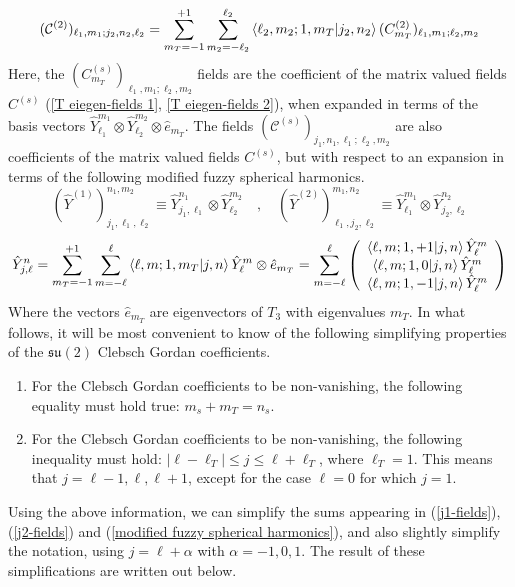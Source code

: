 %
%
\begin{equation}\label{j2-fields}
(\mathcal{C}^{(2)})_{\ell_1, m_1; j_2,n_2,\ell_2}
=
\sum_{m_T = -1}^{+1}
\sum_{m_2 = -\ell_2}^{\ell_2}
\braket{\ell_2,m_2;1,m_T}{j_2, n_2}
(C^{(2)}_{m_T})_{\ell_1,m_1;\ell_2,m_2} 
\end{equation}
%
%
Here, the $(C^{(s)}_{m_T})_{\ell_1,m_1;\ell_2,m_2}$ fields are the coefficient of the matrix valued fields $C^{(s)}$ (\ref{T eiegen-fields 1}, \ref{T eiegen-fields 2}), when expanded in terms of the basis vectors $\hat{Y}^{m_1}_{\ell_1} \otimes \hat{Y}^{m_2}_{\ell_2} \otimes \hat{e}_{m_T}$. The fields $(\mathcal{C}^{(s)})_{j_1,n_1,\ell_1; \ell_2, m_2}$ are also coefficients of the matrix valued fields $C^{(s)}$, but with respect to an expansion in terms of the following modified fuzzy spherical harmonics. 
%
%
\begin{equation}
(\hat{Y}^{(1)})^{n_1,m_2}_{j_1, \ell_1, \ell_2}
\equiv
\hat{Y}^{n_1}_{j_1,\ell_1} \otimes \hat{Y}^{m_2}_{\ell_2}
%
\quad , \quad
%
(\hat{Y}^{(2)})^{m_1,n_2}_{\ell_1,j_2, \ell_2}
\equiv
\hat{Y}^{m_1}_{\ell_1} \otimes \hat{Y}^{n_2}_{j_2,\ell_2}
\end{equation}
%
%
\begin{equation}\label{modified fuzzy spherical harmonics}
\hat{Y}^n_{j,\ell} = \sum_{m_T = -1}^{+1} \sum_{m = -\ell}^{\ell}
\braket{\ell, m;1,m_T}{j,n}
\hat{Y}_\ell^{m} \otimes \hat{e}_{m_T}
=
\sum_{m = -\ell}^{\ell}
\left( \begin{array}{c}
\braket{\ell, m;1,+1}{j,n} \hat{Y}_\ell^{m} \\
\braket{\ell, m;1,0}{j,n} \hat{Y}_\ell^{m} \\
\braket{\ell, m;1,-1}{j,n} \hat{Y}_\ell^{m} \\
\end{array} \right)
\end{equation}
%
%
Where the vectors $\hat{e}_{m_T}$ are eigenvectors of $T_3$ with eigenvalues $m_T$. In what follows, it will be most convenient to know of the following simplifying properties of the $\mathfrak{su}(2)$ Clebsch Gordan coefficients.
%
%
\begin{enumerate}
%
\item For the Clebsch Gordan coefficients to be non-vanishing, the following equality must hold true: $m_s + m_T = n_s$.
%
\item For the Clebsch Gordan coefficients to be non-vanishing, the following inequality must hold: $|\ell - \ell_T| \leq j \leq \ell + \ell_T$, where $\ell_T = 1$. This means that $j = \ell-1,\ell,\ell+1$, except for the case $\ell=0$ for which $j = 1$.
%
\end{enumerate}
%
%
Using the above information, we can simplify the sums appearing in (\ref{j1-fields}), (\ref{j2-fields}) and (\ref{modified fuzzy spherical harmonics}), and also slightly simplify the notation, using $j = \ell + \alpha$ with $\alpha=-1,0,1$. The result of these simplifications are written out below.

